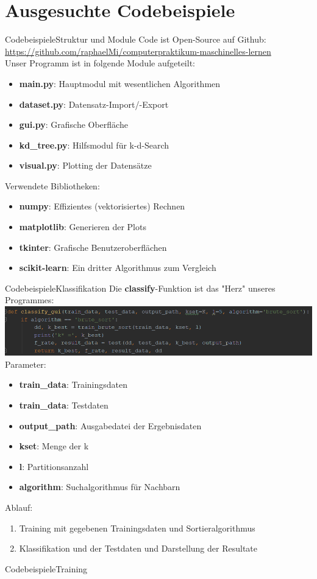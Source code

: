 \documentclass[9pt]{beamer}
\begin{document}
\section{Ausgesuchte Codebeispiele}
\begin{frame}{Codebeispiele}{Struktur und Module}
Code ist Open-Source auf Github: \url{https://github.com/raphaelMi/computerpraktikum-maschinelles-lernen}\\[0.4em]
Unser Programm ist in folgende Module aufgeteilt:
\begin{itemize}
\item{\textbf{main.py}: Hauptmodul mit wesentlichen Algorithmen}
\item{\textbf{dataset.py}: Datensatz-Import/-Export}
\item{\textbf{gui.py}: Grafische Oberfläche}
\item{\textbf{kd\_tree.py}: Hilfsmodul für k-d-Search}
\item{\textbf{visual.py}: Plotting der Datensätze}
\end{itemize}

Verwendete Bibliotheken:
\begin{itemize}
\item{\textbf{numpy}: Effizientes (vektorisiertes) Rechnen}
\item{\textbf{matplotlib}: Generieren der Plots}
\item{\textbf{tkinter}: Grafische Benutzeroberflächen}
\item{\textbf{scikit-learn}: Ein dritter Algorithmus zum Vergleich}
\end{itemize}
\end{frame}
\begin{frame}{Codebeispiele}{Klassifikation}
Die \textbf{classify}-Funktion ist das "Herz" unseres Programmes:
\includegraphics[scale=0.633]{assets/classify_brute.png}\\[0.4em]
Parameter:
\begin{itemize}
\item{\textbf{train\_data}: Trainingsdaten}
\item{\textbf{train\_data}: Testdaten}
\item{\textbf{output\_path}: Ausgabedatei der Ergebnisdaten}
\item{\textbf{kset}: Menge der k}
\item{\textbf{l}: Partitionsanzahl}
\item{\textbf{algorithm}: Suchalgorithmus für Nachbarn}
\end{itemize}
Ablauf:
\begin{enumerate}[1.]
\item{Training mit gegebenen Trainingsdaten und Sortieralgorithmus}
\item{Klassifikation und der Testdaten und Darstellung der Resultate}
\end{enumerate}
\end{frame}

\begin{frame}{Codebeispiele}{Training}

\end{frame}
\end{document}
